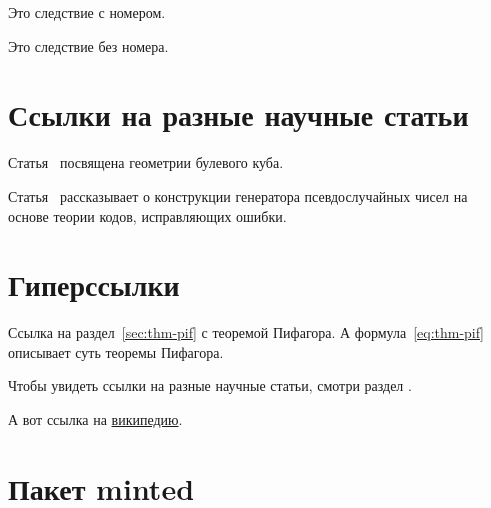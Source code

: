 \documentclass[colorthm, toc]{../civarticle}
\begin{document}
 \Blindtext[11][1]

 \begin{corollary}\label{cor:example:num}
   Это следствие с номером.
   \Blindtext[2]
 \end{corollary}

 \Blindtext[2]

 \begin{corollary*}
   Это следствие без номера.
   \Blindtext[2]
 \end{corollary*}

 \Blindtext[2]


\section{Ссылки на разные научные статьи}
\label{sec:ref-to-articles}

Статья~\cite{ahlswede1977} посвящена геометрии булевого куба.

Статья~\cite{ahmed2013} рассказывает о конструкции генератора
псевдослучайных чисел на основе теории кодов, исправляющих ошибки.


\section{Гиперссылки}
\label{sec:hyper}

Ссылка на раздел~\ref{sec:thm-pif} с теоремой Пифагора.  А
формула~\eqref{eq:thm-pif} описывает суть теоремы Пифагора.

Чтобы увидеть ссылки на разные научные статьи, смотри раздел
\hyperref[sec:ref-to-articles]{}.

А вот ссылка на \href{https://ru.wikipedia.org}{википедию}.


\section{Пакет minted}
\label{sec:minted}
\if \MINTED\empty
\else \inputminted{python}{code.py} \fi
\end{document}
